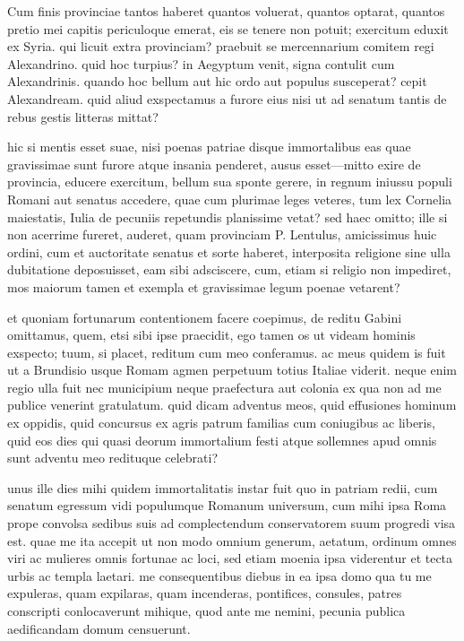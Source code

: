  Cum finis provinciae tantos haberet quantos voluerat, quantos optarat, quantos pretio mei capitis periculoque emerat, eis se tenere non potuit; exercitum eduxit ex Syria. qui licuit extra provinciam? praebuit se mercennarium comitem regi Alexandrino. quid hoc turpius? in Aegyptum venit, signa contulit cum Alexandrinis. quando hoc bellum aut hic ordo aut populus susceperat? cepit Alexandream. quid aliud exspectamus a furore eius nisi ut ad senatum tantis de rebus gestis litteras mittat?

 hic si mentis esset suae, nisi poenas patriae disque immortalibus eas quae gravissimae sunt furore atque insania penderet, ausus esset—mitto exire de provincia, educere exercitum, bellum sua sponte gerere, in regnum iniussu populi Romani aut senatus accedere, quae cum plurimae leges veteres, tum lex Cornelia maiestatis, Iulia de pecuniis repetundis planissime vetat? sed haec omitto; ille si non acerrime fureret, auderet, quam provinciam P. Lentulus, amicissimus huic ordini, cum et auctoritate senatus et sorte haberet, interposita religione sine ulla dubitatione deposuisset, eam sibi adsciscere, cum, etiam si religio non impediret, mos maiorum tamen et exempla et gravissimae legum poenae vetarent?

 et quoniam fortunarum contentionem facere coepimus, de reditu Gabini omittamus, quem, etsi sibi ipse praecidit, ego tamen os ut videam hominis exspecto; tuum, si placet, reditum cum meo conferamus. ac meus quidem is fuit ut a Brundisio usque Romam agmen perpetuum totius Italiae viderit. neque enim regio ulla fuit nec municipium neque praefectura aut colonia ex qua non ad me publice venerint gratulatum. quid dicam adventus meos, quid effusiones hominum ex oppidis, quid concursus ex agris patrum familias cum coniugibus ac liberis, quid eos dies qui quasi deorum immortalium festi atque sollemnes apud omnis sunt adventu meo redituque celebrati?

 unus ille dies mihi quidem immortalitatis instar fuit quo in patriam redii, cum senatum egressum vidi populumque Romanum universum, cum mihi ipsa Roma prope convolsa sedibus suis ad complectendum conservatorem suum progredi visa est. quae me ita accepit ut non modo omnium generum, aetatum, ordinum omnes viri ac mulieres omnis fortunae ac loci, sed etiam moenia ipsa viderentur et tecta urbis ac templa laetari. me consequentibus diebus in ea ipsa domo qua tu me expuleras, quam expilaras, quam incenderas, pontifices, consules, patres conscripti conlocaverunt mihique, quod ante me nemini, pecunia publica aedificandam domum censuerunt.

